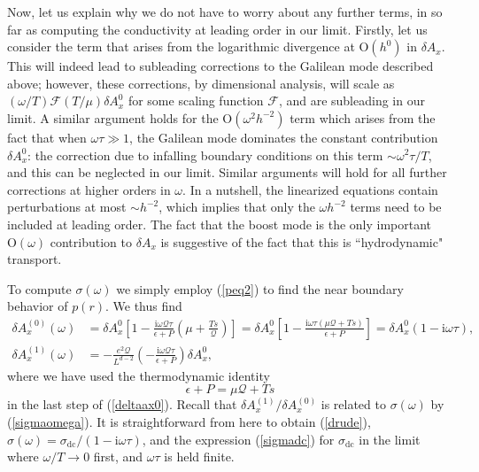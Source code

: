 \documentclass[10pt, oneside]{book}
\begin{document}
\begin{doublespace}
Now, let us explain why we do not have to worry about any further terms, in so far as computing the conductivity at leading order in our limit.   Firstly, let us consider the term that arises from the logarithmic divergence at $\mathrm{O}(h^0)$ in $\delta A_x$.   This will indeed lead to subleading corrections to the Galilean mode described above;  however, these corrections, by dimensional analysis, will scale as $(\omega/T)\mathcal{F}(T/\mu) \delta A_x^0$ for some scaling function $\mathcal{F}$, and are subleading in our limit.   A similar argument holds for the $\mathrm{O}(\omega^2h^{-2})$ term which arises from the fact that when $\omega \tau \gg 1$, the Galilean mode dominates the constant contribution $\delta A_x^0$:   the correction due to infalling boundary conditions on this term $\sim \omega^2 \tau /T$, and this can be neglected in our limit.    Similar arguments will hold for all further corrections at higher orders in $\omega$.   In a nutshell, the linearized equations contain perturbations at most $\sim h^{-2}$, which implies that only the $\omega h^{-2}$ terms need to be included at leading order.   The fact that the boost mode is the only important $\mathrm{O}(\omega)$ contribution to $\delta A_x$ is suggestive of the fact that this is ``hydrodynamic" transport.  

To compute $\sigma(\omega)$ we simply employ (\ref{peq2}) to find the near boundary behavior of $p(r)$.   We thus find \begin{subequations}\begin{align}
\delta A_x^{(0)}(\omega) &= \delta A_x^0 \left[1 - \frac{\mathrm{i}\omega\mathcal{Q}\tau}{\epsilon+P}\left( \mu + \frac{Ts}{\mathcal{Q}}\right)\right]= \delta A_x^0 \left[1 - \frac{\mathrm{i}\omega\tau (\mu \mathcal{Q}+Ts)}{\epsilon+P}\right] =  \delta A_x^0(1-\mathrm{i}\omega \tau),   \label{deltaax0} \\
\delta A_x^{(1)}(\omega) &= -\frac{e^2\mathcal{Q}}{L^{d-2}} \left(- \frac{\mathrm{i}\omega\mathcal{Q}\tau}{\epsilon+P}\right)\delta A_x^0,
\end{align}\end{subequations}where we have used the thermodynamic identity \begin{equation}
\epsilon+P = \mu\mathcal{Q}+Ts
\end{equation} in the last step of (\ref{deltaax0}).   Recall that $\delta A_x^{(1)}/\delta A_x^{(0)}$ is related to $\sigma(\omega)$ by (\ref{sigmaomega}).  It is straightforward from here to obtain (\ref{drude}),  $\sigma(\omega) = \sigma_{\mathrm{dc}}/(1-\mathrm{i}\omega \tau)$, and the expression (\ref{sigmadc}) for $\sigma_{\mathrm{dc}}$ in the limit where $\omega/T\rightarrow 0$ first, and $\omega \tau$ is held finite.


\end{doublespace}
\end{document}
